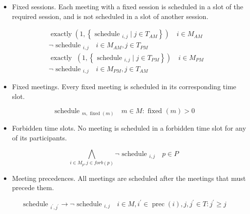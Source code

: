 \documentclass[10pt]{article}
\begin{document}
\begin{itemize}
  \item Fixed sessions. Each meeting with a fixed session is scheduled in a slot of the required session, and is not scheduled in a slot of another session.
\end{itemize}


\begin{align*}
& \operatorname{exactly}\left(1,\left\{\text { schedule }_{i, j} \mid j \in T_{A M}\right\}\right) \quad i \in M_{A M}  \tag{22}\\
& \neg \text { schedule }_{i, j} \quad i \in M_{A M}, j \in T_{P M}  \tag{23}\\
& \operatorname{exactly~}\left(1,\left\{\text { schedule }_{i, j} \mid j \in T_{P M}\right\}\right) \quad i \in M_{P M}  \tag{24}\\
& \neg \text { schedule }_{i, j} \quad i \in M_{P M}, j \in T_{A M} \tag{25}
\end{align*}


\begin{itemize}
  \item Fixed meetings. Every fixed meeting is scheduled in its corresponding time slot.
\end{itemize}


\begin{equation*}
\text { schedule }_{m, \text { fixed }(m)} \quad m \in M: \text { fixed }(m)>0 \tag{26}
\end{equation*}


\begin{itemize}
  \item Forbidden time slots. No meeting is scheduled in a forbidden time slot for any of its participants.
\end{itemize}


\begin{equation*}
\bigwedge_{i \in M_{p}, j \in f o r b(p)} \neg \text { schedule }_{i, j} \quad p \in P \tag{27}
\end{equation*}


\begin{itemize}
  \item Meeting precedences. All meetings are scheduled after the meetings that must precede them.
\end{itemize}


\begin{equation*}
\text { schedule }_{i^{\prime}, j^{\prime}} \rightarrow \neg \text { schedule }_{i, j} \quad i \in M, i^{\prime} \in \operatorname{prec}(i), j, j^{\prime} \in T: j^{\prime} \geq j \tag{28}
\end{equation*}
\end{document}
